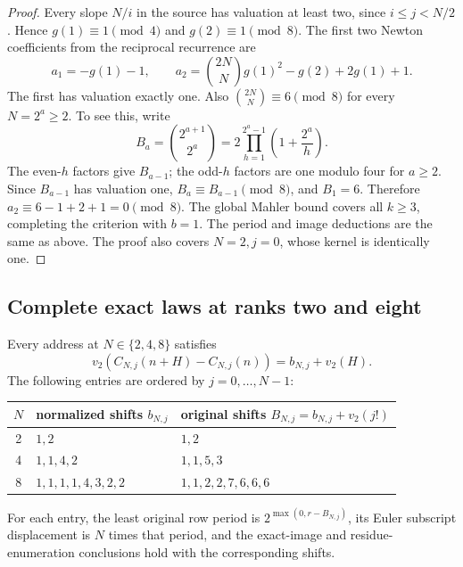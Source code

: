 \begin{proof}
Every slope $N/i$ in the source has valuation at least two, since
$i\leq j<N/2$. Hence $g(1)\equiv1\pmod4$ and
$g(2)\equiv1\pmod8$. The first two Newton coefficients from the
reciprocal recurrence are
\begin{equation}
 a_1=-g(1)-1,\qquad
 a_2=\binom{2N}{N}g(1)^2-g(2)+2g(1)+1.
 \label{eq:lower-half-initial-newton}
\end{equation}
The first has valuation exactly one. Also
$\binom{2N}{N}\equiv6\pmod8$ for every $N=2^a\geq2$.
To see this, write
\[
 B_a=\binom{2^{a+1}}{2^a}
       =2\prod_{h=1}^{2^a-1}\left(1+\frac{2^a}{h}\right).
\]
The even-$h$ factors give $B_{a-1}$; the odd-$h$ factors are one
modulo four for $a\geq2$. Since $B_{a-1}$ has valuation one,
$B_a\equiv B_{a-1}\pmod8$, and $B_1=6$.
Therefore $a_2\equiv6-1+2+1=0\pmod8$.
The global Mahler bound covers all $k\geq3$, completing the criterion
with $b=1$. The period and image deductions are the same as above.
The proof also covers $N=2,j=0$, whose kernel is identically one.
\end{proof}

\subsection{Complete exact laws at ranks two and eight}

\begin{proposition}
\label{prop:two-four-eight-isometry-table}
Every address at $N\in\{2,4,8\}$ satisfies
\[
 v_2(C_{N,j}(n+H)-C_{N,j}(n))=b_{N,j}+v_2(H).
\]
The following entries are ordered by $j=0,\ldots,N-1$:
\begin{center}
\begin{tabular}{c l l}
$N$&normalized shifts $b_{N,j}$&original shifts $B_{N,j}=b_{N,j}+v_2(j!)$\\\hline
2&$1,2$&$1,2$\\
4&$1,1,4,2$&$1,1,5,3$\\
8&$1,1,1,1,4,3,2,2$&$1,1,2,2,7,6,6,6$
\end{tabular}
\end{center}
For each entry, the least original row period is
$2^{\max(0,r-B_{N,j})}$, its Euler subscript displacement is $N$ times
that period, and the exact-image and residue-enumeration conclusions
hold with the corresponding shifts.
\end{proposition}

